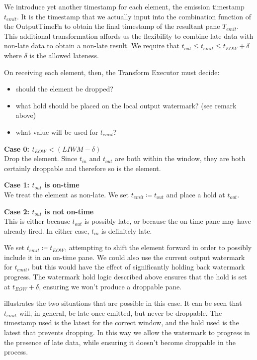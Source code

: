 We introduce yet another timestamp for each element, the emission timestamp $t_{\mathit{emit}}$.
It is the timestamp that we actually input into the combination function of the OutputTimeFn to obtain the final timestamp of the resultant pane $T_{\mathit{emit}}$.
This additional transformation affords us the flexibility to combine late data with non-late data to obtain a non-late result.
We require that $t_{\mathit{out}} \leq t_{\mathit{emit}} \leq t_{\mathit{EOW}} + \delta$ where $\delta$ is the allowed lateness.

On receiving each element, then, the Transform Executor must decide:
\begin{itemize}
	\item should the element be dropped?
	\item what hold should be placed on the local output watermark? (see remark above)
	\item what value will be used for $t_{\mathit{emit}}$?
\end{itemize}

\textbf{Case 0: $t_{\mathit{EOW}} < (\mathit{LIWM} - \delta)$}\\
Drop the element.
Since $t_{\mathit{in}}$ and $t_{\mathit{out}}$ are both within the window, they are both certainly droppable and therefore so is the element.

\textbf{Case 1: $t_{\mathit{out}}$ is on-time}\\
We treat the element as non-late.
We set $t_{\mathit{emit}} \coloneq t_{\mathit{out}}$ and place a hold at $t_{\mathit{out}}$.

\textbf{Case 2: $t_{\mathit{out}}$ is not on-time}\\
This is either because $t_{\mathit{out}}$ is possibly late, or because the on-time pane may have already fired.
In either case, $t_{\mathit{in}}$ is definitely late.

We set $t_{\mathit{emit}} \coloneq t_{\mathit{EOW}}$, attempting to shift the element forward in order to possibly include it in an on-time pane.
We could also use the current output watermark for $t_{\mathit{emit}}$, but this would have the effect of significantly holding back watermark progress.
The watermark hold logic described above ensures that the hold is set at $t_{\mathit{EOW}} + \delta$, ensuring we won't produce a droppable pane.

 illustrates the two situations that are possible in this case. It can be seen that $t_{\mathit{emit}}$ will, in general, be late once emitted, but never be droppable. 
The timestamp used is the latest for the correct window, and the hold used is the latest that prevents dropping.
In this way we allow the watermark to progress in the presence of late data, while ensuring it doesn't become droppable in the process.


